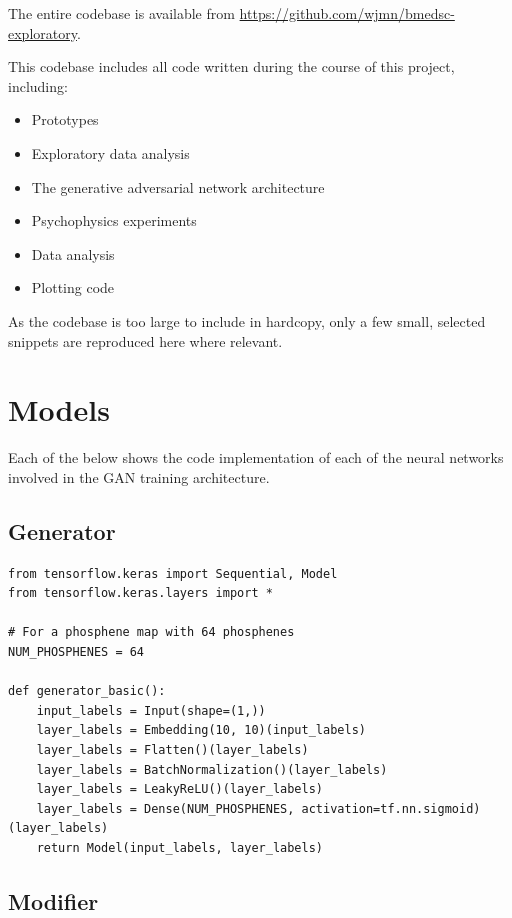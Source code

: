 \documentclass[a4paper,11pt,openany]{book}
\begin{document}
\begin{appendices}
The entire codebase is available from \url{https://github.com/wjmn/bmedsc-exploratory}.

This codebase includes all code written during the course of this project, including:
\begin{itemize}
\item Prototypes
\item Exploratory data analysis
\item The generative adversarial network architecture
\item Psychophysics experiments
\item Data analysis
\item Plotting code
\end{itemize}

As the codebase is too large to include in hardcopy, only a few small, selected snippets are reproduced here where relevant.

\section*{Models}
\label{sec:org01aeec6}

Each of the below shows the code implementation of each of the neural networks involved in the GAN training architecture.

\subsection*{Generator}
\label{sec:org5e2edc3}

\begin{small}
\begin{verbatim}
from tensorflow.keras import Sequential, Model
from tensorflow.keras.layers import *

# For a phosphene map with 64 phosphenes
NUM_PHOSPHENES = 64

def generator_basic():
    input_labels = Input(shape=(1,))
    layer_labels = Embedding(10, 10)(input_labels)
    layer_labels = Flatten()(layer_labels)
    layer_labels = BatchNormalization()(layer_labels)
    layer_labels = LeakyReLU()(layer_labels)
    layer_labels = Dense(NUM_PHOSPHENES, activation=tf.nn.sigmoid)(layer_labels)
    return Model(input_labels, layer_labels)
\end{verbatim}
\end{small}

\subsection*{Modifier}
\label{sec:org07eef5c}
\label{org2779a3c}


\end{appendices}
\end{document}
